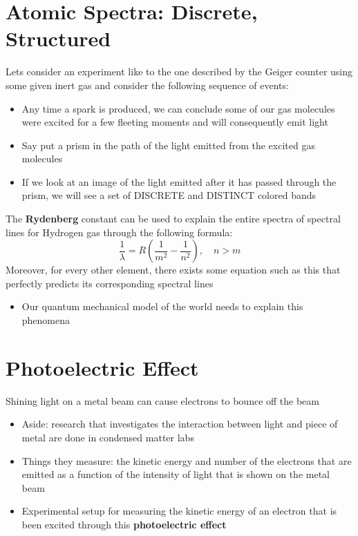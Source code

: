 \documentclass[a4paper]{article}
\begin{document}
\section{Atomic Spectra: Discrete, Structured}
Lets consider an experiment like to the one described by the Geiger counter using some given inert gas and consider the following sequence of events:
\begin{itemize}
    \item Any time a spark is produced, we can conclude some of our gas molecules were excited for a few fleeting moments and will consequently emit light
    \item Say put a prism in the path of the light emitted from the excited gas molecules 
    \item If we look at an image of the light emitted after it has passed through the prism, we will see a set of DISCRETE and DISTINCT colored bands 
\end{itemize}
The \textbf{Rydenberg} constant can be used to explain the entire spectra of spectral lines for Hydrogen gas through the following formula: 
\begin{equation}
    \frac{1}{\lambda} = R \left( \frac{1}{m^2} - \frac{1}{n^2} \right), \quad n>m
\end{equation}
Moreover, for every other element, there exists some equation such as this that perfectly predicts its corresponding spectral lines 
\begin{itemize}
    \item Our quantum mechanical model of the world needs to explain this phenomena 
\end{itemize}
\section{Photoelectric Effect}
Shining light on a metal beam can cause electrons to bounce off the beam
\begin{itemize}
    \item Aside: research that investigates the interaction between light and piece of metal are done in condensed matter labs
    \item Things they measure: the kinetic energy and number of the electrons that are emitted as a function of the intensity of light that is shown on the metal beam
    \item Experimental setup for measuring the kinetic energy of an electron that is been excited through this \textbf{photoelectric effect}
\end{itemize}
\end{document}
